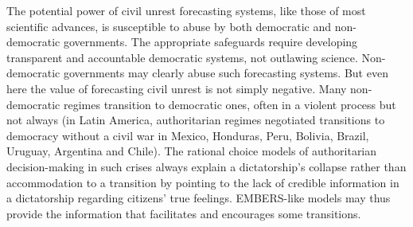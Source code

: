 The potential power of civil unrest forecasting systems, like those
of most scientific advances, is susceptible to abuse by
both democratic and non-democratic governments. The appropriate safeguards require
developing transparent and accountable democratic systems, not outlawing science.
Non-democratic governments may clearly abuse such forecasting systems. But even
here the value of forecasting civil unrest is not simply negative. Many non-democratic regimes transition to democratic
ones, often in a violent process but not always (in Latin America, authoritarian regimes negotiated
transitions to democracy without a civil war in Mexico, Honduras, Peru, Bolivia, Brazil,
Uruguay, Argentina and Chile). The rational choice models of authoritarian decision-making in
such crises always explain a dictatorship’s collapse rather than accommodation to
a transition by pointing to the lack of credible information in
a dictatorship regarding citizens’ true feelings. EMBERS-like models may thus provide the
information that facilitates and encourages some transitions.

